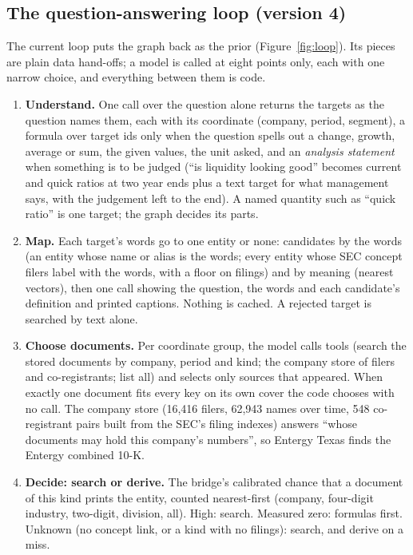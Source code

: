 \subsection{The question-answering loop (version 4)}
\label{sec:impl-loop}

The current loop puts the graph back as the prior (Figure~\ref{fig:loop}). Its pieces are plain data hand-offs; a model is called at eight points only, each with one narrow choice, and everything between them is code.



\begin{enumerate}
\item \textbf{Understand.} One call over the question alone returns the targets as the question names them, each with its coordinate (company, period, segment), a formula over target ids only when the question spells out a change, growth, average or sum, the given values, the unit asked, and an \emph{analysis statement} when something is to be judged (``is liquidity looking good'' becomes current and quick ratios at two year ends plus a text target for what management says, with the judgement left to the end). A named quantity such as ``quick ratio'' is one target; the graph decides its parts.
\item \textbf{Map.} Each target's words go to one entity or none: candidates by the words (an entity whose name or alias is the words; every entity whose SEC concept filers label with the words, with a floor on filings) and by meaning (nearest vectors), then one call showing the question, the words and each candidate's definition and printed captions. Nothing is cached. A rejected target is searched by text alone.
\item \textbf{Choose documents.} Per coordinate group, the model calls tools (search the stored documents by company, period and kind; the company store of filers and co-registrants; list all) and selects only sources that appeared. When exactly one document fits every key on its own cover the code chooses with no call. The company store (16,416 filers, 62,943 names over time, 548 co-registrant pairs built from the SEC's filing indexes) answers ``whose documents may hold this company's numbers'', so Entergy Texas finds the Entergy combined 10-K.
\item \textbf{Decide: search or derive.} The bridge's calibrated chance that a document of this kind prints the entity, counted nearest-first (company, four-digit industry, two-digit, division, all). High: search. Measured zero: formulas first. Unknown (no concept link, or a kind with no filings): search, and derive on a miss.

\end{enumerate}
